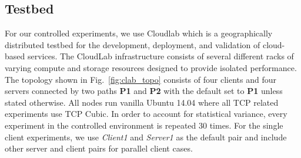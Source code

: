 \subsection{Testbed}
For our controlled experiments, we use Cloudlab \cite{RicciEide} which is a geographically distributed testbed for
the development, deployment, and validation of cloud-based services. The CloudLab infrastructure consists of several different racks of varying compute and storage resources designed to provide isolated performance. The topology shown in Fig.~\ref{fig:clab_topo} consists of four clients and four servers connected by two paths \textbf{P1} and \textbf{P2} with the default set to \textbf{P1} unless stated otherwise. All nodes run vanilla Ubuntu 14.04 where all TCP related experiments use TCP Cubic. In order to account for statistical variance, every experiment in the controlled environment is repeated 30 times. For the single client experiments, we use \textit{Client1} and \textit{Server1} as the default pair and include other server and client pairs for parallel client cases.
